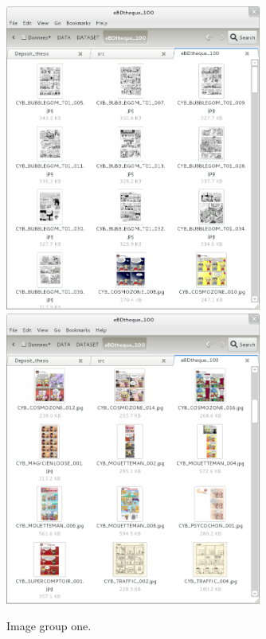   \begin{figure}[h!]  %
    \centering
    \includegraphics[trim= 5px 10px 30px 152px, clip, width=0.75\textwidth]{thumb_01.png}\\
    \includegraphics[trim= 5px 10px 30px 152px, clip, width=0.75\textwidth]{thumb_02.png}
    
    \caption{Image group one.}
    \label{fig:app:1_2}
  \end{figure}

